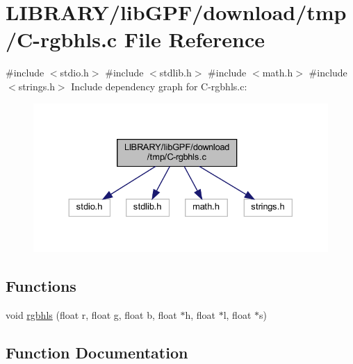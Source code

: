 \hypertarget{C-rgbhls_8c}{}\section{L\+I\+B\+R\+A\+R\+Y/lib\+G\+P\+F/download/tmp/\+C-\/rgbhls.c File Reference}
\label{C-rgbhls_8c}
{\ttfamily \#include $<$stdio.\+h$>$}\newline
{\ttfamily \#include $<$stdlib.\+h$>$}\newline
{\ttfamily \#include $<$math.\+h$>$}\newline
{\ttfamily \#include $<$strings.\+h$>$}\newline
Include dependency graph for C-\/rgbhls.c\+:
\nopagebreak
\begin{figure}[H]
\begin{center}
\leavevmode
\includegraphics[width=330pt]{C-rgbhls_8c__incl}
\end{center}
\end{figure}
\subsection*{Functions}
\begin{DoxyCompactItemize}
\item 
void \hyperlink{C-rgbhls_8c_abf59942f8e2e56ebf4efafcef62b2813}{rgbhls} (float r, float g, float b, float $\ast$h, float $\ast$l, float $\ast$s)
\end{DoxyCompactItemize}


\subsection{Function Documentation}
\mbox{\label{C-rgbhls_8c_abf59942f8e2e56ebf4efafcef62b2813}} 
